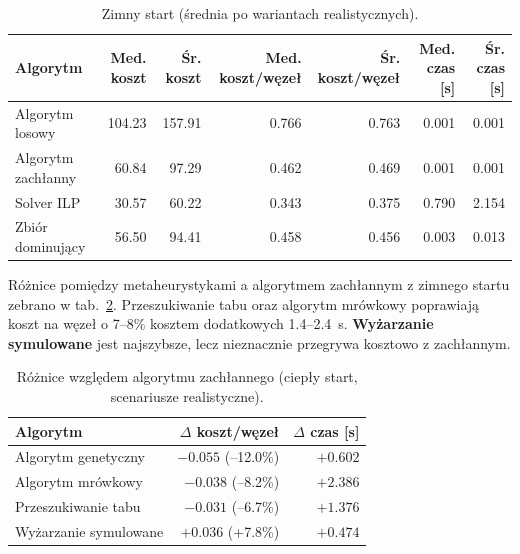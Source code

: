 \begin{table}[H]
  \centering
  \caption{Zimny start (średnia po wariantach realistycznych).}
  \label{tab:dyn-real-cold}
  \begin{tabular}{lrrrrrr}
    \toprule
    \textbf{Algorytm}  & \textbf{Med. koszt} & \textbf{Śr. koszt} & \textbf{Med. koszt/węzeł} & \textbf{Śr. koszt/węzeł} & \textbf{Med. czas [s]} & \textbf{Śr. czas [s]} \\
    \midrule
    Algorytm losowy    & 104.23              & 157.91             & 0.766                     & 0.763                    & 0.001                  & 0.001                 \\
    Algorytm zachłanny & 60.84               & 97.29              & 0.462                     & 0.469                    & 0.001                  & 0.001                 \\
    Solver ILP         & 30.57               & 60.22              & 0.343                     & 0.375                    & 0.790                  & 2.154                 \\
    Zbiór dominujący   & 56.50               & 94.41              & 0.458                     & 0.456                    & 0.003                  & 0.013                 \\
  \end{tabular}
\end{table}

Różnice pomiędzy metaheurystykami a algorytmem zachłannym z zimnego startu zebrano w tab.~\ref{tab:dyn-real-delta}. Przeszukiwanie tabu oraz algorytm mrówkowy poprawiają koszt na węzeł o 7--8\% kosztem dodatkowych 1.4--2.4~s. \textbf{Wyżarzanie symulowane} jest najszybsze, lecz nieznacznie przegrywa kosztowo z zachłannym.

\begin{table}[H]
  \centering
  \caption{Różnice względem algorytmu zachłannego (ciepły start, scenariusze realistyczne).}
  \label{tab:dyn-real-delta}
  \begin{tabular}{lrr}
    \toprule
    \textbf{Algorytm}     & \textbf{$\Delta$ koszt/węzeł} & \textbf{$\Delta$ czas [s]} \\
    \midrule
    Algorytm genetyczny   & $-0.055$ (–12.0\%)            & $+0.602$                   \\
    Algorytm mrówkowy     & $-0.038$ (–8.2\%)             & $+2.386$                   \\
    Przeszukiwanie tabu   & $-0.031$ (–6.7\%)             & $+1.376$                   \\
    Wyżarzanie symulowane & $+0.036$ (+7.8\%)             & $+0.474$                   \\
  \end{tabular}
\end{table}

